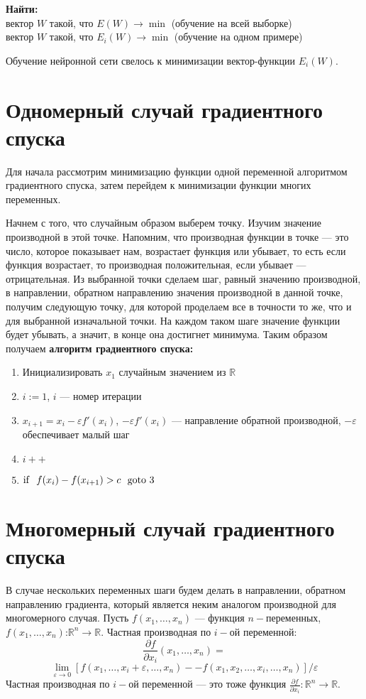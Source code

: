 \documentclass[14pt]{extreport}
\begin{document}
        {\bf 
            Найти:
        } \\
           вектор $W$ такой, что $E(W) \rightarrow \min$ (обучение на всей выборке)\\
           вектор $W$ такой, что $E_i(W) \rightarrow \min$ (обучение на одном примере)
        
        \medskip
        Обучение нейронной сети свелось к минимизации вектор-функции $E_i(W)$. 
    \section{Одномерный случай градиентного спуска}
        Для начала рассмотрим минимизацию функции одной переменной алгоритмом градиентного спуска, затем перейдем к минимизации функции многих переменных.

        Начнем с того, что случайным образом выберем точку. Изучим значение производной в этой точке. Напомним, что производная функции в точке --- это число, которое показывает нам, возрастает функция или убывает, то есть если функция возрастает, то производная положительная, если убывает --- отрицательная.
        Из выбранной точки сделаем шаг, равный значению производной, в направлении, обратном направлению значения производной в данной точке, получим следующую точку, для которой проделаем все в точности то же, что и для выбранной изначальной точки. На каждом таком шаге значение функции будет убывать, а значит, в конце она достигнет минимума. Таким образом получаем \textbf{алгоритм градиентного спуска:}
        \begin{enumerate}
         \item Инициализировать $x_1$ случайным значением из $\mathbb{R}$
         \item $i:=1$, $i$ --- номер итерации
         \item $x_{i+1}=x_i-\varepsilon f'(x_i)$, $-\varepsilon f'(x_i)$ --- направление обратной производной, $-\varepsilon$ обеспечивает малый шаг
         \item $i++$
         \item ${\rm if}\ \ f(x_{i})-f(x_{i+1}) >c\ \ {\rm goto}\ 3$
        \end{enumerate}
        
    \section{Многомерный случай градиентного спуска}
        В случае нескольких переменных шаги будем делать в направлении, обратном направлению градиента, который является неким аналогом производной для многомерного случая.
        Пусть $f(x_1, \ldots, x_n)$ --- функция $n-$переменных, $f(x_1, \ldots, x_n)$:$\mathbb{R}^n\rightarrow \mathbb{R}$.
        Частная производная по $i-$ой переменной: $$\frac{\partial f}{\partial x_i}(x_1, \ldots, x_n) = $$
        $$\lim_{\varepsilon \to  0}[f(x_1, \ldots, x_i + \varepsilon, \ldots, x_n) -- f(x_1, x_2, \ldots, x_i, \ldots, x_n)]/ \varepsilon$$
        Частная производная по $i-$ой переменной --- это тоже функция $\frac{\partial f}{\partial x_i}: \mathbb{R}^n\rightarrow \mathbb{R}$.
\end{document}
